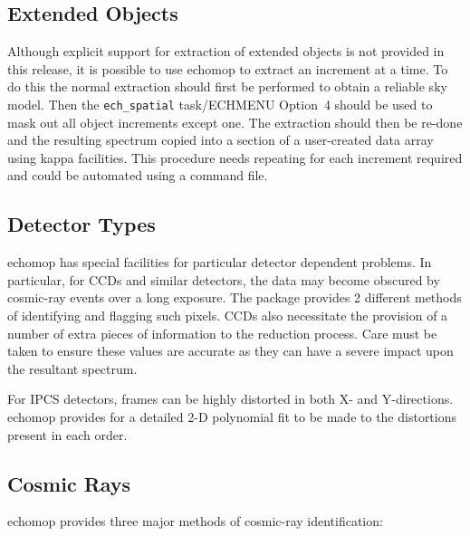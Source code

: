 \documentclass[11pt,twoside]{article}
\makeatletter
\newcommand{\htmlref}[2]{#1}
\newcommand{\xref}[3]{#1}
\newcommand{\xlabel}[1]{}
\newcommand{\mlabel}[1]{\xlabel{#1}\label{#1}}
\newcommand{\myindex}[1]{\index{#1}}
\newcommand{\indexcmdname}[1]{\index{#1@\protect\cmdname{#1}}}
\renewcommand{\myindex}[1]{}
\renewcommand{\indexcmdname}[1]{}
\newcommand{\cmdname}{\begingroup \catcode`\_=12 \realcmdname}
\newcommand{\realcmdname}[1]{\endgroup\texttt{#1}}
\makeatother
\begin{document}
\subsection{\mlabel{extended_objects}Extended Objects}
\myindex{Extended object frames}
\indexcmdname{ECH_SPATIAL}

Although explicit support for extraction of extended objects is not
provided in this release, it is possible to use {\sc echomop} to extract
an increment at a time.  To do this the normal extraction should first be
performed to obtain a reliable sky model.  Then the \htmlref{{\tt ech\_spatial}
task/ECHMENU Option~4}{ech_spatial}
should be used to mask out all object increments except
one.  The extraction should then be re-done and the resulting spectrum copied
into a section of a user-created data array using
\xref{{\sc kappa}}{sun95}{} facilities.
This procedure needs repeating for each increment required and could be
automated using a command file.


\subsection{\mlabel{detector_types}Detector Types}
\myindex{CCD}
\myindex{IPCS}

{\sc echomop} has special facilities for particular detector dependent
problems. In particular, for CCDs and similar detectors, the data may
become obscured by cosmic-ray events over a long exposure. The package
provides 2 different methods of identifying and flagging such pixels. CCDs
also necessitate the provision of a number of extra pieces of information
to the reduction process. Care must be taken to ensure these values are
accurate as they can have a severe impact upon the resultant spectrum.

For IPCS detectors, frames can be highly distorted in both X- and
Y-directions.  {\sc echomop} provides for a detailed 2-D polynomial fit to be
made to the distortions present in each order.


\subsection{\mlabel{cosmic_rays}Cosmic Rays}
\myindex{Cosmic rays!location of}

{\sc echomop} provides three major methods of cosmic-ray identification:
\end{document}
